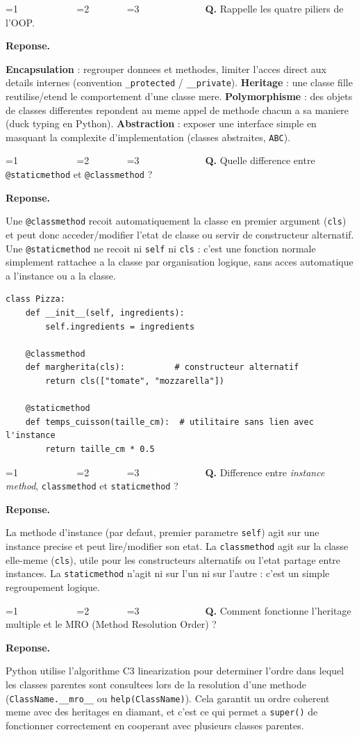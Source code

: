 \documentclass[11pt,a4paper]{article}
\newcommand{\badgeJ}{\textcolor{white}{\colorbox{junior}{\small\bfseries\ JUNIOR\ }}}
\newcommand{\badgeM}{\textcolor{white}{\colorbox{mid}{\small\bfseries\ MID\ }}}
\newcommand{\badgeS}{\textcolor{white}{\colorbox{senior}{\small\bfseries\ SENIOR\ }}}
\newcounter{qcount}
\newenvironment{qa}[2]{%
  \stepcounter{qcount}%
  \par\vspace{6pt}%
  \noindent\colorbox{qbg}{\parbox{\dimexpr\linewidth-12pt}{\vspace{2pt}%
  \ifnum#1=1 \badgeJ\fi\ifnum#1=2 \badgeM\fi\ifnum#1=3 \badgeS\fi
  \ \textbf{Q\theqcount.} #2\vspace{2pt}}}\par\vspace{4pt}%
  \noindent\textbf{\color{accent}Reponse.}\ \ignorespaces
}{%
  \par\vspace{8pt}%
}
\begin{document}
\begin{qa}{1}{Rappelle les quatre piliers de l'OOP.}
\textbf{Encapsulation} : regrouper donnees et methodes, limiter l'acces direct
aux details internes (convention \texttt{\_protected} / \texttt{\_\_private}).
\textbf{Heritage} : une classe fille reutilise/etend le comportement d'une
classe mere. \textbf{Polymorphisme} : des objets de classes differentes
repondent au meme appel de methode chacun a sa maniere (duck typing en
Python). \textbf{Abstraction} : exposer une interface simple en masquant la
complexite d'implementation (classes abstraites, \texttt{ABC}).
\end{qa}

\begin{qa}{1}{Quelle difference entre \texttt{@staticmethod} et \texttt{@classmethod} ?}
Une \texttt{@classmethod} recoit automatiquement la classe en premier
argument (\texttt{cls}) et peut donc acceder/modifier l'etat de classe ou
servir de constructeur alternatif. Une \texttt{@staticmethod} ne recoit ni
\texttt{self} ni \texttt{cls} : c'est une fonction normale simplement
rattachee a la classe par organisation logique, sans acces automatique a
l'instance ou a la classe.
\begin{lstlisting}
class Pizza:
    def __init__(self, ingredients):
        self.ingredients = ingredients

    @classmethod
    def margherita(cls):          # constructeur alternatif
        return cls(["tomate", "mozzarella"])

    @staticmethod
    def temps_cuisson(taille_cm):  # utilitaire sans lien avec l'instance
        return taille_cm * 0.5
\end{lstlisting}
\end{qa}

\begin{qa}{1}{Difference entre \emph{instance method}, \texttt{classmethod} et \texttt{staticmethod} ?}
La methode d'instance (par defaut, premier parametre \texttt{self}) agit sur
une instance precise et peut lire/modifier son etat. La \texttt{classmethod}
agit sur la classe elle-meme (\texttt{cls}), utile pour les constructeurs
alternatifs ou l'etat partage entre instances. La \texttt{staticmethod} n'agit
ni sur l'un ni sur l'autre : c'est un simple regroupement logique.
\end{qa}

\begin{qa}{2}{Comment fonctionne l'heritage multiple et le MRO (Method Resolution Order) ?}
Python utilise l'algorithme C3 linearization pour determiner l'ordre dans
lequel les classes parentes sont consultees lors de la resolution d'une
methode (\texttt{ClassName.\_\_mro\_\_} ou \texttt{help(ClassName)}). Cela
garantit un ordre coherent meme avec des heritages en diamant, et c'est ce qui
permet a \texttt{super()} de fonctionner correctement en cooperant avec
plusieurs classes parentes.
\end{qa}
\end{document}

